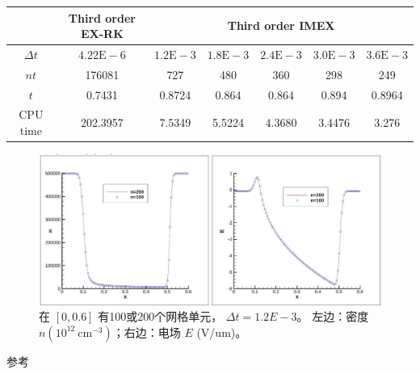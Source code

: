 \begin{center}
    \begin{tabular}{|c|c|c|c|c|c|c|}
        \hline
                   & Third order EX-RK   & \multicolumn{5}{|c|}{Third order IMEX}                                                                                     \\
        \hline
        $\Delta t$ & $4.22 \mathrm{E}-6$ & $1.2 \mathrm{E}-3$                     & $1.8 \mathrm{E}-3$ & $2.4 \mathrm{E}-3$ & $3.0 \mathrm{E}-3$ & $3.6 \mathrm{E}-3$ \\
        \hline
        $n t$      & 176081              & 727                                    & 480                & 360                & 298                & 249                \\
        \hline
        $t$        & 0.7431              & 0.8724                                 & 0.864              & 0.864              & 0.894              & 0.8964             \\
        \hline
        CPU time   & 202.3957            & 7.5349                                 & 5.5224             & 4.3680             & 3.4476             & 3.276              \\
        \hline
    \end{tabular}
\end{center}
\begin{figure}
    \centering
    \includegraphics[width=\textwidth]{figure/numbericalsimulationresulttranslation}
    \caption{在 $[0,0.6]$ 有100或200个网格单元， $\Delta t=1.2 E-3$。 左边：密度 $n\left(10^{12} \mathrm{~cm}^{-3}\right)$；右边：电场 $E$ (V/um)。}
    \label{fig:numbericalsimulationresulttranslation}
\end{figure}

参考~\cite{zjuthesisrules, zjuthesis}

\begingroup
{}
\printbibliography[title={外文翻译参考文献}]
\endgroup
